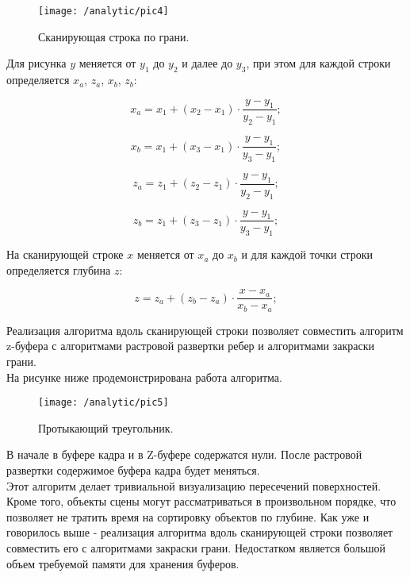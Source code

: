 \begin{figure}[H]
\center
\texttt{[image: /analytic/pic4]}
\caption{Сканирующая строка по грани.}
\end{figure}

Для рисунка $y$ меняется от $y_{1}$ до $y_{2}$ и далее до $y_{3}$, при этом для каждой строки определяется $x_{a}$, $z_{a}$, $x_{b}$, $z_{b}$:

\begin{equation}
	x_{a} = x_{1} + (x_{2} - x_{1}) \cdot \frac{y - y_{1}}{y_{2} - y_{1}};
\end{equation}

\begin{equation}
	x_{b} = x_{1} + (x_{3} - x_{1}) \cdot \frac{y - y_{1}}{y_{3} - y_{1}};
\end{equation}

\begin{equation}
	z_{a} = z_{1} + (z_{2} - z_{1}) \cdot \frac{y - y_{1}}{y_{2} - y_{1}};
\end{equation}

\begin{equation}
	z_{b} = z_{1} + (z_{3} - z_{1}) \cdot \frac{y - y_{1}}{y_{3} - y_{1}};
\end{equation}

На сканирующей строке $x$ меняется от $x_{a}$ до $x_{b}$ и для каждой точки строки определяется глубина $z$:

\begin{equation}
	z = z_{a} + (z_{b} - z_{a}) \cdot \frac{x - x_{a}}{x_{b} - x_{a}};
\end{equation}

Реализация алгоритма вдоль сканирующей строки позволяет совместить алгоритм z-буфера с алгоритмами растровой развертки ребер и алгоритмами закраски грани.\\

На рисунке ниже продемонстрирована работа алгоритма.

\begin{figure}[H]
\center
\texttt{[image: /analytic/pic5]}
\caption{Протыкающий треугольник.}
\end{figure}

В начале в буфере кадра и в Z-буфере содержатся нули. После растровой развертки содержимое буфера кадра будет меняться.\\

Этот алгоритм делает тривиальной визуализацию пересечений поверхностей. Кроме того, объекты сцены могут рассматриваться в произвольном порядке, что позволяет не тратить время на сортировку объектов по глубине. Как уже и говорилось выше - реализация алгоритма вдоль сканирующей строки позволяет совместить его с алгоритмами закраски грани. Недостатком является большой объем требуемой памяти для хранения буферов.

